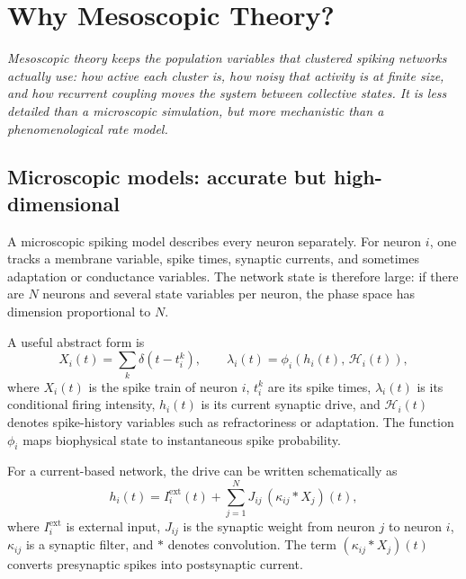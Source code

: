\chapter{Why Mesoscopic Theory?}
\label{ch:why-mesoscopic-theory}

\textit{Mesoscopic theory keeps the population variables that clustered spiking networks actually use: how active each cluster is, how noisy that activity is at finite size, and how recurrent coupling moves the system between collective states. It is less detailed than a microscopic simulation, but more mechanistic than a phenomenological rate model.}

\section{Microscopic models: accurate but high-dimensional}
\label{sec:microscopic-models-high-dimensional}

A microscopic spiking model describes every neuron separately. For neuron $i$, one tracks a membrane variable, spike times, synaptic currents, and sometimes adaptation or conductance variables. The network state is therefore large: if there are $N$ neurons and several state variables per neuron, the phase space has dimension proportional to $N$.

A useful abstract form is
%
\begin{equation}
  X_i(t)=\sum_k \delta(t-t_i^k),
  \qquad
  \lambda_i(t)=\phi_i\!\left(h_i(t),\,\mathcal{H}_i(t)\right),
  \label{eq:microscopic-point-process}
\end{equation}
%
where $X_i(t)$ is the spike train of neuron $i$, $t_i^k$ are its spike times, $\lambda_i(t)$ is its conditional firing intensity, $h_i(t)$ is its current synaptic drive, and $\mathcal{H}_i(t)$ denotes spike-history variables such as refractoriness or adaptation. The function $\phi_i$ maps biophysical state to instantaneous spike probability.

For a current-based network, the drive can be written schematically as
%
\begin{equation}
  h_i(t)
  =
  I_i^{\mathrm{ext}}(t)
  + \sum_{j=1}^N J_{ij}\,(\kappa_{ij} * X_j)(t),
  \label{eq:microscopic-synaptic-drive}
\end{equation}
%
where $I_i^{\mathrm{ext}}$ is external input, $J_{ij}$ is the synaptic weight from neuron $j$ to neuron $i$, $\kappa_{ij}$ is a synaptic filter, and $*$ denotes convolution. The term $(\kappa_{ij} * X_j)(t)$ converts presynaptic spikes into postsynaptic current.

